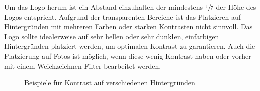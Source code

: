 \documentclass{article}
\begin{document}
Um das Logo herum ist ein Abstand einzuhalten der mindestens $\sfrac{1}{7}$ der Höhe des Logos entspricht. Aufgrund der transparenten Bereiche ist das Platzieren auf Hintergründen mit mehreren Farben oder starken Kontrasten nicht sinnvoll. Das Logo sollte idealerweise auf sehr hellen oder sehr dunklen, einfarbigen Hintergründen platziert werden, um optimalen Kontrast zu garantieren. Auch die Platzierung auf Fotos ist möglich, wenn diese wenig Kontrast haben oder vorher mit einem Weichzeichnen-Filter bearbeitet werden.

\begin{figure}[H]
\begin{centering}
\hfill
{}
\hfill

\hfill
{}
\hfill
\end{centering}
\caption{Beispiele für Kontrast auf verschiedenen Hintergründen}
\end{figure}
\end{document}
